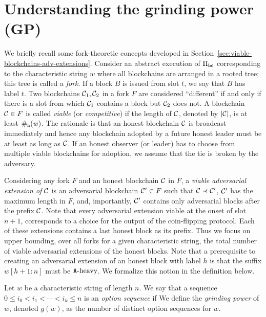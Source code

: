 \section{Understanding the grinding power (GP)}

We briefly recall some fork-theoretic concepts
developed in Section~\ref{sec:viable-blockchains-adv-extensions}. 
Consider an abstract execution of $\Pi_\mathsf{bc}$ 
corresponding to the characteristic string $w$ 
where 
all blockchains are arranged in a rooted tree; 
this tree is called a \emph{fork}. 
If a block $B$ is issued from slot $t$, 
we say that $B$ has label $t$.
Two blockchains $\mathcal{C}_1, \mathcal{C}_2$ in a fork $F$ are considered ``different'' 
if and only if there is a slot from which 
$\mathcal{C}_1$ contains a block but $\mathcal{C}_2$ does not. 
A blockchain $\mathcal{C} \in F$ is called \emph{viable} (or \emph{competitive}) 
if the length of $\mathcal{C}$, denoted by $|\mathcal{C}|$, 
is at least $\#_{\mathtt{h}}(w)$. 
The rationale is that an honest blockchain $\mathcal{C}$ is broadcast immediately 
and hence any blockchain adopted by a future honest leader
must be at least as long as $\mathcal{C}$. 
If an honest observer (or leader) has to choose from multiple viable blockchains for adoption, 
we assume that the tie is broken by the adversary. 

Considering any fork $F$ and an honest blockchain $\mathcal{C}$ in $F$, 
a \emph{viable adversarial extension of $\mathcal{C}$} 
is an adversarial blockchain $\mathcal{C}' \in F$ 
such that $\mathcal{C} \prec \mathcal{C}'$, 
$\mathcal{C}'$ has the maximum length in $F$, 
and, importantly, $\mathcal{C}'$ contains only adversarial blocks after the prefix $\mathcal{C}$. 
Note that every adversarial extension 
viable at the onset of slot $n + 1$, 
corresponds to a choice 
for the output of the coin-flipping protocol. 
Each of these extensions contains a last honest block as its prefix. 
Thus we focus on upper bounding, 
over all forks for a given characteristic string, 
the total number of viable adversarial extensions 
of the honest blocks.
Note that a prerequisite to creating an adversarial extension 
of an honest block with label $h$ is that 
the suffix $w[h + 1 : n]$ must be $\mathtt{A}\text{-heavy}$.
We formalize this notion in the definition below.

\begin{definition}\label{def:option-sequence}
  Let $w$ be a characteristic string of length $n$. 
  We say that a sequence
  $
    0 \leq i_0 < i_1 < \cdots < i_k \leq n
  $
  is an \emph{option sequence} if
  We define the \emph{grinding power} of $w$, denoted $g(w)$, 
  as the 
  number of distinct option sequences for $w$.
\end{definition}


